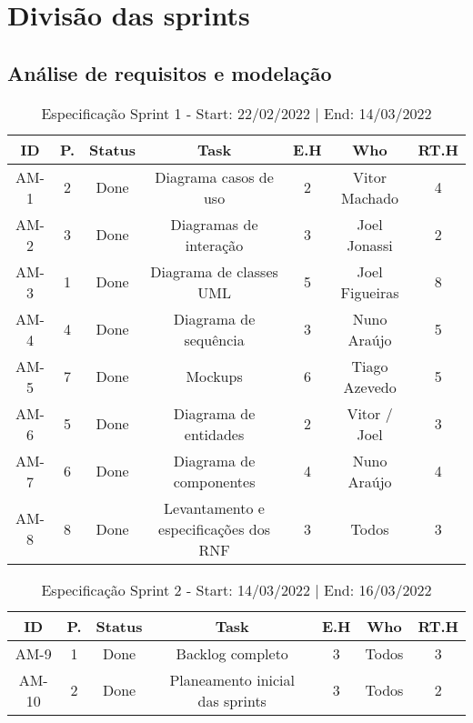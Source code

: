 \section{Divisão das sprints}

\subsection{Análise de requisitos e modelação}

\begin{table}[h]
    \centering
    \begin{tabular}{|c|c|c|c|c|c|c|}
        \hline
        ID & P. & Status & Task & E.H & Who & RT.H \\
        \hline                               %
        AM-1 & 2 & Done & Diagrama casos de uso & 2 & Vitor Machado & 4 \\
        AM-2 & 3 & Done & Diagramas de interação & 3 & Joel Jonassi & 2 \\
        AM-3 & 1 & Done & Diagrama de classes UML & 5 & Joel Figueiras & 8 \\
        AM-4 & 4 & Done & Diagrama de sequência & 3 & Nuno Araújo & 5 \\
        AM-5 & 7 & Done & Mockups & 6 & Tiago Azevedo & 5 \\
        AM-6 & 5 & Done & Diagrama de entidades & 2 & Vitor / Joel & 3 \\
        AM-7 & 6 & Done & Diagrama de componentes & 4 & Nuno Araújo & 4 \\
        AM-8 & 8 & Done & Levantamento e especificações dos RNF & 3 & Todos & 3 \\
        \hline 
    \end{tabular}
    \caption{Especificação Sprint 1 - Start: 22/02/2022 | End: 14/03/2022 }
\end{table}

\begin{table}[h]
    \centering
    \begin{tabular}{|c|c|c|c|c|c|c|}
        \hline
        ID & P. & Status & Task & E.H & Who & RT.H \\
        \hline                               %
        AM-9 & 1 & Done & Backlog completo & 3 & Todos & 3 \\
        AM-10 & 2 & Done & Planeamento inicial das sprints & 3 & Todos & 2 \\
        \hline 
    \end{tabular}
    \caption{Especificação Sprint 2 - Start: 14/03/2022 | End: 16/03/2022}
\end{table}
\newpage

